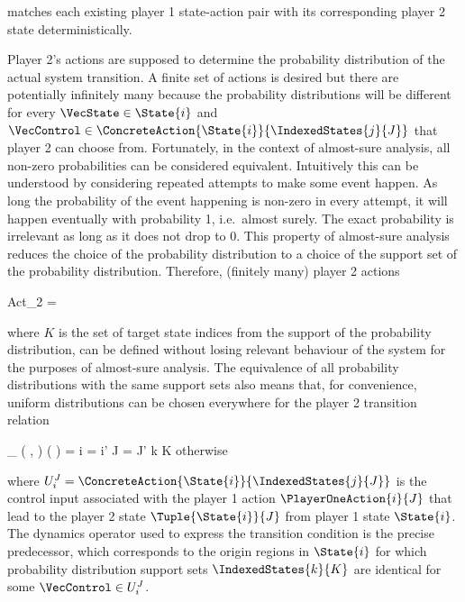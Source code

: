     matches each existing player 1 state-action pair with its corresponding player 2 state deterministically.

    Player 2's actions are supposed to determine the probability distribution of the actual system transition.
    A finite set of actions is desired but there are potentially infinitely many because the probability distributions will be different for every $\VecState \in \State{i}$ and $\VecControl \in \ConcreteAction{\State{i}}{\IndexedStates{j}{J}}$ that player 2 can choose from.
    Fortunately, in the context of almost-sure analysis, all non-zero probabilities can be considered equivalent.
    Intuitively this can be understood by considering repeated attempts to make some event happen.
    As long the probability of the event happening is non-zero in every attempt, it will happen eventually with probability 1, i.e.\ almost surely.
    The exact probability is irrelevant as long as it does not drop to 0.
    This property of almost-sure analysis reduces the choice of the probability distribution to a choice of the support set of the probability distribution.
    Therefore, (finitely many) player 2 actions

    \startformula
        Act_2 =  \EndComma
    \stopformula

    where $K$ is the set of target state indices from the support of the probability distribution, can be defined without losing relevant behaviour of the system for the purposes of almost-sure analysis.
    The equivalence of all probability distributions with the same support sets also means that, for convenience, uniform distributions can be chosen everywhere for the player 2 transition relation

    \startformula
        \Transition_\GameGraph
            \Big( ,  \Big)
            \Big(  \Big)
        = \startmathcases
            \NC \displaystyle{}
            \MC \startgathered
                    \NC \StartIf i = i' \MidAnd J = J' \MidAnd k \in K
                    \NR
                    \NC \quad \MidAnd {} \neq \emptyset
                    \NR
                \stopgathered
            \NR
            \NC otherwise \EndComma
            \NR
        \stopmathcases
    \stopformula

    where $U_i^J = \ConcreteAction{\State{i}}{\IndexedStates{j}{J}}$ is the control input associated with the player 1 action $\PlayerOneAction{i}{J}$ that lead to the player 2 state $\Tuple{\State{i}}{J}$ from player 1 state $\State{i}$.
    The dynamics operator used to express the transition condition is the precise predecessor, which corresponds to the origin regions in $\State{i}$ for which probability distribution support sets $\IndexedStates{k}{K}$ are identical for some $\VecControl \in U_i^J$.

